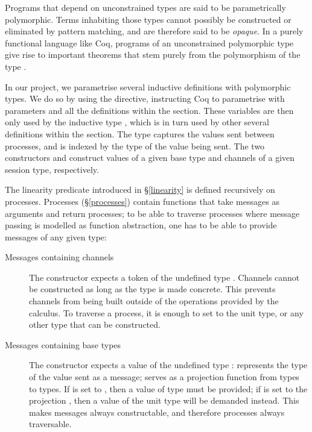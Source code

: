 \documentclass{mproj}
\begin{document}
Programs that depend on unconstrained types are said to be parametrically polymorphic. Terms inhabiting those types cannot possibly be constructed or eliminated by pattern matching, and are therefore said to be \emph{opaque}. In a purely functional language like Coq, programs of an unconstrained polymorphic type give rise to important theorems that stem purely from the polymorphism of the type \cite{Wadler1989}.

In our project, we parametrise several inductive definitions with polymorphic types. We do so by using the  directive, instructing Coq to parametrise with parameters  and  all the definitions within the section. These variables are then only used by the inductive type , which is in turn used by other several definitions within the section. The type  captures the values sent between processes, and is indexed by the type of the value being sent. The two constructors  and  construct values of a given base type and channels of a given session type, respectively.


The linearity predicate introduced in \S \ref{linearity} is defined recursively on processes. Processes (\S \ref{processes}) contain functions that take messages as arguments and return processes; to be able to traverse processes where message passing is modelled as function abstraction, one has to be able to provide messages of any given type:
\begin{description}
    \item [Messages containing channels] The  constructor expects a token of the undefined type . Channels cannot be constructed as long as the type  is made concrete. This prevents channels from being built outside of the operations provided by the calculus. To traverse a process, it is enough to set  to the unit type, or any other type that can be constructed.
        
    \item [Messages containing base types] The  constructor expects a value of the undefined type :  represents the type of the value sent as a message;  serves as a projection function from types to types. If  is set to , then a value of type  must be provided; if  is set to the projection , then a value of the unit type will be demanded instead. This makes messages always constructable, and therefore processes always traversable. 
\end{description}
\end{document}
